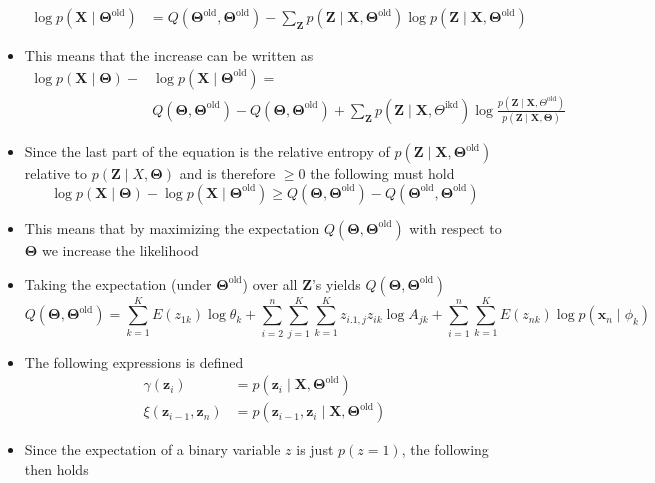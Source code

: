 \documentclass[a4, english]{article}
\begin{document}
\begin{itemize}
\begin{align*}
    \log p(\pmb X \mid \pmb \Theta^{\text{old}}) &= Q(\pmb \Theta^\text{old}, \pmb \Theta^\text{old})- \sum_{\pmb Z} p(\pmb Z \mid \pmb X, \pmb \Theta^\text{old}) \log p(\pmb Z \mid \pmb X, \pmb \Theta^\text{old}) 
  \end{align*}
  \item This means that the increase can be written as 
  \begin{align*}
    \log p(\pmb X \mid \pmb \Theta) - &\log p(\pmb X \mid \pmb \Theta^\text{old}) = \\ & Q(\pmb \Theta, \pmb \Theta^\text{old}) - Q(\pmb \Theta, \pmb \Theta^\text{old}) + \sum_{\pmb Z} p(\pmb Z \mid \pmb X, \Theta^\text{ikd})\log \frac{p(\pmb Z \mid \pmb X , \Theta ^\text{old})}{p(\pmb Z \mid \pmb X, \pmb \Theta)}
  \end{align*}
  \item Since the last part of the equation is the relative entropy of $p(\pmb Z \mid \pmb X, \pmb \Theta^\text{old})$ relative to $p(\pmb Z \mid X, \pmb \Theta)$ and is therefore $\geq 0$ the following must hold
 \begin{equation*}
    \log p(\pmb X \mid \pmb \Theta) - \log p(\pmb X \mid \pmb \Theta^\text{old}) \geq Q(\pmb \Theta, \pmb \Theta^\text{old}) - Q(\pmb \Theta^\text{old}, \pmb \Theta^\text{old}) 
 \end{equation*}
  \item This means that by maximizing the expectation $Q(\pmb \Theta, \pmb \Theta^\text{old})$ with respect to $\pmb \Theta$ we increase the likelihood
  \item Taking the expectation (under $\pmb \Theta ^\text{old}$) over all $\pmb Z$'s yields $Q(\pmb \Theta, \pmb \Theta^\text{old})$ 
  \begin{equation*}
    Q(\pmb \Theta, \pmb \Theta^\text{old}) = \sum_{k=1}^KE(z_{1k}) \log \theta_k + \sum_{i=2}^n \sum_{j=1}^K\sum_{k=1}^K z_{i.1,j}z_{ik} \log A_{jk} + \sum_{i=1}^n\sum_{k=1}^K E(z_{nk}) \log p(\pmb x_n \mid \phi_k)
  \end{equation*}
  \item The following expressions is defined 
  \begin{align*}
              \gamma(\pmb z_i) &= p(\pmb z_i \mid \pmb X, \pmb \Theta^\text{old}) \\
    \xi(\pmb z_{i-1}, \pmb z_n) &= p(\pmb z_{i-1}, \pmb z_i \mid \pmb X, \pmb \Theta^\text{old})
  \end{align*}
  \item Since the expectation of a binary variable $z$ is just $p(z=1)$, the following then holds 

\end{itemize}
\end{document}
